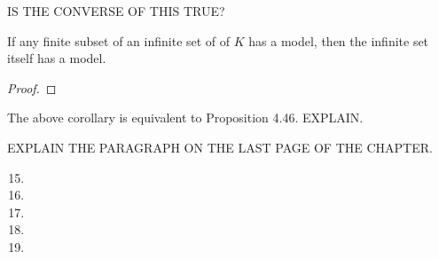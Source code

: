 IS THE CONVERSE OF THIS TRUE?

\begin{corollary}
  If any finite subset of an infinite set of \wfs{} of \(K\) has a model, then the infinite set itself has a model.

  \begin{proof}
  \end{proof}
\end{corollary}

The above corollary is equivalent to Proposition 4.46. EXPLAIN.

EXPLAIN THE PARAGRAPH ON THE LAST PAGE OF THE CHAPTER.

\solutions{}
\begin{enumerate}
  \setcounter{enumi}{14}
  \item %
  \item %
  \item %
  \item %
  \item %
\end{enumerate}
